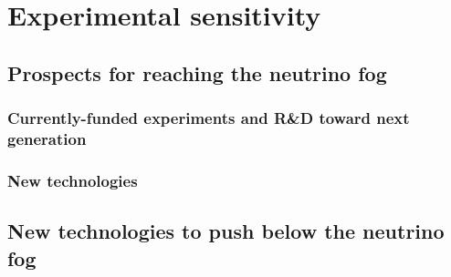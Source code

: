 \section{Experimental sensitivity}
\label{sec:experiment}



\subsection{Prospects for reaching the neutrino fog}

\subsubsection{Currently-funded experiments and R\&D toward next generation}
\label{sec:currentexperiments}











\subsubsection{New technologies}






\subsection{New technologies to push below the neutrino fog}
\label{sec:beyondnufog}
